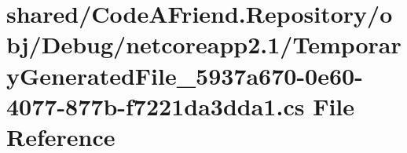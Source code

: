 \hypertarget{shared_2_code_a_friend_8_repository_2obj_2_debug_2netcoreapp2_81_2_temporary_generated_file__5935975163223c70d9b42a92eb232f2ca52}{}\section{shared/\+Code\+A\+Friend.Repository/obj/\+Debug/netcoreapp2.1/\+Temporary\+Generated\+File\+\_\+5937a670-\/0e60-\/4077-\/877b-\/f7221da3dda1.cs File Reference}
\label{shared_2_code_a_friend_8_repository_2obj_2_debug_2netcoreapp2_81_2_temporary_generated_file__5935975163223c70d9b42a92eb232f2ca52}
